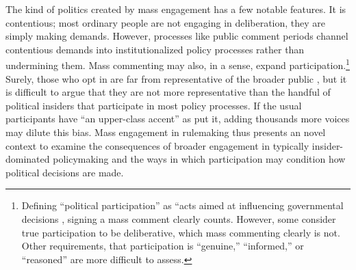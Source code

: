 The kind of politics created by mass engagement has a few notable features. It is contentious; most ordinary people are not engaging in deliberation, they are simply making demands. However, processes like public comment periods channel contentious demands into institutionalized policy processes rather than undermining them. Mass commenting may also, in a sense, expand participation.\footnote{
Defining ``political participation'' as ``acts aimed at influencing governmental decisions \citep[p. 2]{Verba1987}, signing a mass comment clearly counts. However, some consider true participation to be deliberative, which mass commenting clearly is not. Other requirements, that participation is ``genuine,'' ``informed,'' or ``reasoned'' are more difficult to assess. %
} 
Surely, those who opt in are far from representative of the broader public \citep{Verba1987}, but it is difficult to argue that they are not more representative than the handful of political insiders that participate in most policy processes. If the usual participants have ``an upper-class accent'' as \citet{Schattschneider1942} put it, adding thousands more voices may dilute this bias. Mass engagement in rulemaking thus presents an novel context to examine the consequences of broader engagement in typically insider-dominated policymaking and the ways in which participation may condition how political decisions are made. 












